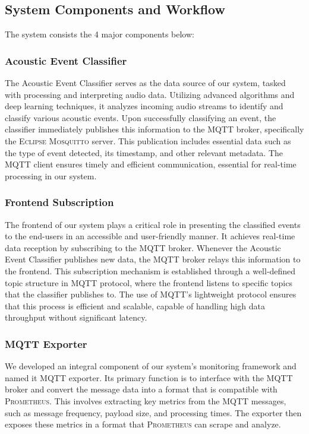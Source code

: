\subsection{System Components and Workflow}
The system consists the 4 major components below:
\subsubsection{Acoustic Event Classifier}
The Acoustic Event Classifier serves as the data source of our system, tasked with processing and interpreting audio data\cite{sampath2019cnn}. Utilizing advanced algorithms and deep learning techniques, it analyzes incoming audio streams to identify and classify various acoustic events. Upon successfully classifying an event, the classifier immediately publishes this information to the MQTT broker, specifically the \textsc{Eclipse Mosquitto} server. This publication includes essential data such as the type of event detected, its timestamp, and other relevant metadata. The MQTT client ensures timely and efficient communication, essential for real-time processing in our system.

\subsubsection{Frontend Subscription}
The frontend of our system plays a critical role in presenting the classified events to the end-users in an accessible and user-friendly manner. It achieves real-time data reception by subscribing to the MQTT broker. Whenever the Acoustic Event Classifier publishes new data, the MQTT broker relays this information to the frontend. This subscription mechanism is established through a well-defined topic structure in MQTT protocol, where the frontend listens to specific topics that the classifier publishes to. The use of MQTT’s lightweight protocol ensures that this process is efficient and scalable, capable of handling high data throughput without significant latency.

\subsubsection{MQTT Exporter}
We developed an integral component of our system's monitoring framework and named it MQTT exporter. Its primary function is to interface with the MQTT broker and convert the message data into a format that is compatible with \textsc{Prometheus}. This involves extracting key metrics from the MQTT messages, such as message frequency, payload size, and processing times. The exporter then exposes these metrics in a format that \textsc{Prometheus} can scrape and analyze.

